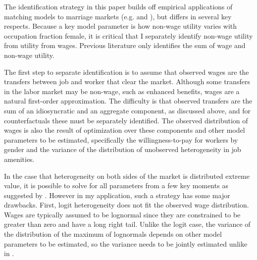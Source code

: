 \documentclass[11pt]{article}
\begin{document}








The identification strategy in this paper builds off empirical applications of matching models to marriage markets (e.g.  and ), but differs in several key respects. Because a key model parameter is how non-wage utility varies with occupation fraction female, it is critical that I separately identify non-wage utility from utility from wages. Previous literature only identifies the sum of wage and non-wage utility. 

The first step to separate identification is to assume that observed wages are the transfers between job and worker that clear the market. Although some transfers in the labor market may be non-wage, such as enhanced benefits, wages are a natural first-order approximation. The difficulty is that observed transfers are the sum of an idiosyncratic and an aggregate component, as discussed above, and for counterfactuals these must be separately identified. The observed distribution of wages is also the result of optimization over these components and other model parameters to be estimated, specifically the willingness-to-pay for workers by gender and the variance of the distribution of unobserved heterogeneity in job amenities. 

In the case that heterogeneity on both sides of the market is distributed extreme value, it is possible to solve for all parameters from a few key moments as suggested by . However in my application, such a strategy has some major drawbacks. First, logit heterogeneity does not fit the observed wage distribution. Wages are typically assumed to be lognormal since they are constrained to be greater than zero and have a long right tail. Unlike the logit case, the variance of the distribution of the maximum of lognormals depends on other model parameters to be estimated, so the variance needs to be jointly estimated unlike in .
\end{document}
